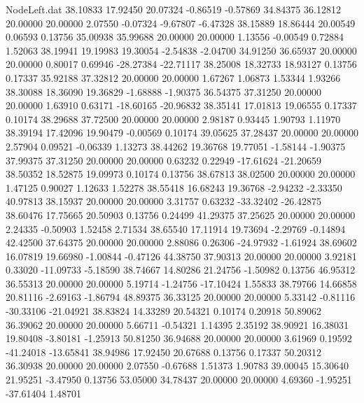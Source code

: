 \begin{filecontents}{NodeLeft.dat}
  38.10833   17.92450   20.07324    -0.86519   -0.57869   34.84375   36.12812   20.00000   20.00000    2.07550   -0.07324   -9.67807   -6.47328
  38.15889   18.86444   20.00549     0.06593    0.13756   35.00938   35.99688   20.00000   20.00000    1.13556   -0.00549    0.72884    1.52063
  38.19941   19.19983   19.30054    -2.54838   -2.04700   34.91250   36.65937   20.00000   20.00000    0.80017    0.69946  -28.27384  -22.71117
  38.25008   18.32733   18.93127     0.13756    0.17337   35.92188   37.32812   20.00000   20.00000    1.67267    1.06873    1.53344    1.93266
  38.30088   18.36090   19.36829    -1.68888   -1.90375   36.54375   37.31250   20.00000   20.00000    1.63910    0.63171  -18.60165  -20.96832
  38.35141   17.01813   19.06555     0.17337    0.10174   38.29688   37.72500   20.00000   20.00000    2.98187    0.93445    1.90793    1.11970
  38.39194   17.42096   19.90479    -0.00569    0.10174   39.05625   37.28437   20.00000   20.00000    2.57904    0.09521   -0.06339    1.13273
  38.44262   19.36768   19.77051    -1.58144   -1.90375   37.99375   37.31250   20.00000   20.00000    0.63232    0.22949  -17.61624  -21.20659
  38.50352   18.52875   19.09973     0.10174    0.13756   38.67813   38.02500   20.00000   20.00000    1.47125    0.90027    1.12633    1.52278
  38.55418   16.68243   19.36768    -2.94232   -2.33350   40.97813   38.15937   20.00000   20.00000    3.31757    0.63232  -33.32402  -26.42875
  38.60476   17.75665   20.50903     0.13756    0.24499   41.29375   37.25625   20.00000   20.00000    2.24335   -0.50903    1.52458    2.71534
  38.65540   17.11914   19.73694    -2.29769   -0.14894   42.42500   37.64375   20.00000   20.00000    2.88086    0.26306  -24.97932   -1.61924
  38.69602   16.07819   19.66980    -1.00844   -0.47126   44.38750   37.90313   20.00000   20.00000    3.92181    0.33020  -11.09733   -5.18590
  38.74667   14.80286   21.24756    -1.50982    0.13756   46.95312   36.55313   20.00000   20.00000    5.19714   -1.24756  -17.10424    1.55833
  38.79766   14.66858   20.81116    -2.69163   -1.86794   48.89375   36.33125   20.00000   20.00000    5.33142   -0.81116  -30.33106  -21.04921
  38.83824   14.33289   20.54321     0.10174    0.20918   50.89062   36.39062   20.00000   20.00000    5.66711   -0.54321    1.14395    2.35192
  38.90921   16.38031   19.80408    -3.80181   -1.25913   50.81250   36.94688   20.00000   20.00000    3.61969    0.19592  -41.24018  -13.65841
  38.94986   17.92450   20.67688     0.13756    0.17337   50.20312   36.30938   20.00000   20.00000    2.07550   -0.67688    1.51373    1.90783
  39.00045   15.30640   21.95251    -3.47950    0.13756   53.05000   34.78437   20.00000   20.00000    4.69360   -1.95251  -37.61404    1.48701

\end{filecontents}

